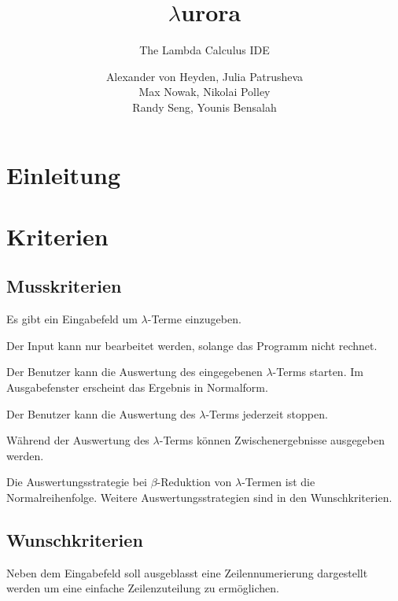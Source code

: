 \documentclass[parskip=full,11pt,twoside]{scrartcl}
\title{$\lambda$urora}
\subtitle{The Lambda Calculus IDE}
\author{Alexander von Heyden, Julia Patrusheva\\
 Max Nowak, Nikolai Polley\\
 Randy Seng, Younis Bensalah}
\begin{document}
\maketitle
\newpage
\tableofcontents

\newpage
\section{Einleitung}


\pagebreak
\section{Kriterien}


\subsection{Musskriterien}

Es gibt ein Eingabefeld um $\lambda$-Terme einzugeben.

Der Input kann nur bearbeitet werden, solange das Programm nicht rechnet.

Der Benutzer kann die Auswertung des eingegebenen $\lambda$-Terms starten. Im Ausgabefenster erscheint das Ergebnis in Normalform. 

Der Benutzer kann die Auswertung des $\lambda$-Terms jederzeit stoppen.

Während der Auswertung des $\lambda$-Terms können Zwischenergebnisse ausgegeben werden.

Die Auswertungsstrategie bei $\beta$-Reduktion von $\lambda$-Termen ist die Normalreihenfolge. Weitere Auswertungsstrategien sind in den Wunschkriterien.


\newpage
\subsection{Wunschkriterien}

Neben dem Eingabefeld soll ausgeblasst eine Zeilennumerierung dargestellt werden um eine einfache Zeilenzuteilung zu ermöglichen.
\end{document}
